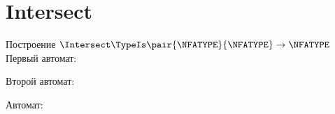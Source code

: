 \section{Intersect}
\begin{frame}{Построение $\Intersect\TypeIs\pair{\NFATYPE}{\NFATYPE}\to\NFATYPE$}
	Первый автомат:


	Второй автомат:


	Автомат:


\end{frame}
